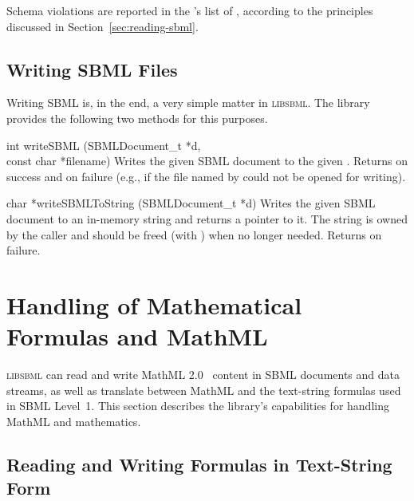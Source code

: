 \documentclass{sbmlmanual}
\newcommand{\libsbml}{\textsc{libsbml}}
\begin{document}
Schema violations are reported in the 's list of
, according to the principles discussed in
Section~\ref{sec:reading-sbml}.


\subsection{Writing SBML Files}
\label{sec:writing-sbml}

Writing SBML is, in the end, a very simple matter in \libsbml{}.  The
library provides the following two methods for this purposes.


\begin{methoddef}{int writeSBML (SBMLDocument\_t *d, \\const char *filename)}
  Writes the given SBML document to the given .  Returns
   on success and  on failure (e.g., if the file named by
   could not be opened for writing).
\end{methoddef}


\begin{methoddef}{char *writeSBMLToString (SBMLDocument\_t *d)}
  Writes the given SBML document to an in-memory string and returns a
  pointer to it.  The string is owned by the caller and should be freed
  (with ) when no longer needed.  Returns  on
  failure.
\end{methoddef}



\section{Handling of Mathematical Formulas and MathML}
\label{sec:mathml}

\libsbml{} can read and write MathML 2.0~\citep{ausbrooks_2001b} content in
SBML documents and data streams, as well as translate between MathML and
the text-string formulas used in SBML Level~1.  This section describes the
library's capabilities for handling MathML and mathematics.

\subsection{Reading and Writing Formulas in Text-String Form}
\label{sec:text-string-math}
\end{document}
